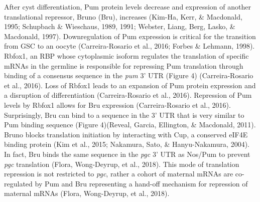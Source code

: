 \documentclass[12pt,twoside]{reedthesis}
\begin{document}
After cyst differentiation, Pum protein levels decrease and expression
of another translational repressor, Bruno (Bru), increases
(Kim-Ha, Kerr, \& Macdonald, 1995; Schupbach \& Wieschaus, 1989, 1991; Webster, Liang, Berg, Lasko, \& Macdonald, 1997). Downregulation of Pum expression is
critical for the transition from GSC to an oocyte
(Carreira-Rosario et al., 2016; Forbes \& Lehmann, 1998). Rbfox1, an RBP whose
cytoplasmic isoform regulates the translation of specific mRNAs in the
germline is responsible for repressing Pum translation through binding
of a consensus sequence in the \emph{pum} 3' UTR (Figure 4)
(Carreira-Rosario et al., 2016). Loss of Rbfox1 leads to an expansion of Pum
protein expression and a disruption of differentiation
(Carreira-Rosario et al., 2016). Repression of Pum levels by Rbfox1 allows
for Bru expression (Carreira-Rosario et al., 2016). Surprisingly, Bru can
bind to a sequence in the 3' UTR that is very similar to Pum binding
sequence (Figure 4)(Reveal, Garcia, Ellington, \& Macdonald, 2011). Bruno blocks translation
initiation by interacting with Cup, a conserved eIF4E binding protein
(Kim et al., 2015; Nakamura, Sato, \& Hanyu-Nakamura, 2004). In fact, Bru binds the same sequence in
the \emph{pgc} 3' UTR as Nos/Pum to prevent \emph{pgc} translation
(Flora, Wong-Deyrup, et al., 2018). This mode of translation repression is not restricted
to \emph{pgc}, rather a cohort of maternal mRNAs are co-regulated by Pum and
Bru representing a hand-off mechanism for repression of maternal mRNAs
(Flora, Wong-Deyrup, et al., 2018).
\end{document}
